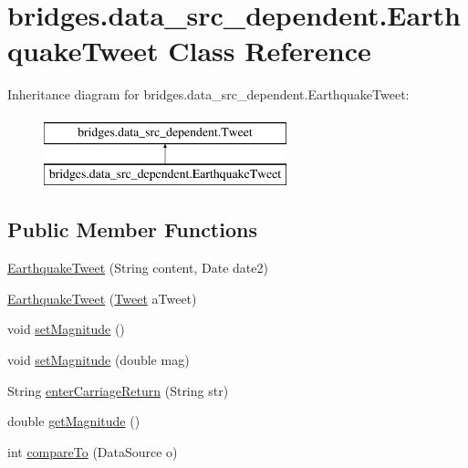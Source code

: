 \hypertarget{classbridges_1_1data__src__dependent_1_1_earthquake_tweet}{}\section{bridges.\+data\+\_\+src\+\_\+dependent.\+Earthquake\+Tweet Class Reference}
\label{classbridges_1_1data__src__dependent_1_1_earthquake_tweet}
Inheritance diagram for bridges.\+data\+\_\+src\+\_\+dependent.\+Earthquake\+Tweet\+:\begin{figure}[H]
\begin{center}
\leavevmode
\includegraphics[height=2.000000cm]{classbridges_1_1data__src__dependent_1_1_earthquake_tweet}
\end{center}
\end{figure}
\subsection*{Public Member Functions}
\begin{DoxyCompactItemize}
\item 
\hyperlink{classbridges_1_1data__src__dependent_1_1_earthquake_tweet_a1f2d4634e85c75c59ba9d4aec878db54}{Earthquake\+Tweet} (String content, Date date2)
\item 
\hyperlink{classbridges_1_1data__src__dependent_1_1_earthquake_tweet_af0a8e9201997a7d4805f11c02f197410}{Earthquake\+Tweet} (\hyperlink{classbridges_1_1data__src__dependent_1_1_tweet}{Tweet} a\+Tweet)
\item 
void \hyperlink{classbridges_1_1data__src__dependent_1_1_earthquake_tweet_a49880f314eee430098ca347cd07ff470}{set\+Magnitude} ()
\item 
void \hyperlink{classbridges_1_1data__src__dependent_1_1_earthquake_tweet_a763d8a261a563e66af95c5a97850ecc0}{set\+Magnitude} (double mag)
\item 
String \hyperlink{classbridges_1_1data__src__dependent_1_1_earthquake_tweet_a3e39d6fa01f24cb259d32bb39108feb1}{enter\+Carriage\+Return} (String str)
\item 
double \hyperlink{classbridges_1_1data__src__dependent_1_1_earthquake_tweet_a8f3d92b4e60b922e996ecfaee3c5260e}{get\+Magnitude} ()
\item 
int \hyperlink{classbridges_1_1data__src__dependent_1_1_earthquake_tweet_a6b4de2a600b93ed96f6cde8b719ea645}{compare\+To} (Data\+Source o)
\end{DoxyCompactItemize}


